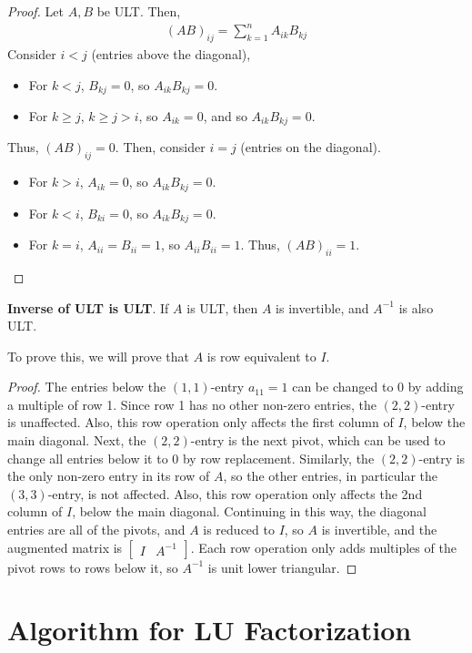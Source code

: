 \documentclass[letterpaper,12pt]{article}
\begin{document}
\begin{proof}
Let $A, B$ be ULT. Then,
\begin{align*}
    (AB)_{ij} = \sum_{k=1}^n A_{ik} B_{kj}
\end{align*}
Consider $i < j$ (entries above the diagonal),
\begin{itemize}
    \item For $k < j$, $B_{kj} = 0$, so $A_{ik} B_{kj} = 0$.
    \item For $k \geq j$, $k \geq j > i$, so $A_{ik} = 0$, and so $A_{ik} B_{kj} = 0$.
\end{itemize}
Thus, $(AB)_{ij} = 0$. Then, consider $i = j$ (entries on the diagonal).
\begin{itemize}
    \item For $k > i$, $A_{ik} = 0$, so $A_{ik} B_{kj} = 0$.
    \item For $k < i$, $B_{ki} = 0$, so $A_{ik} B_{kj} = 0$.
    \item For $k = i$, $A_{ii} = B_{ii} = 1$, so $A_{ii} B_{ii} = 1$. Thus, $(AB)_{ii} = 1$.
\end{itemize}
\end{proof}

\begin{theorem}
\textbf{Inverse of ULT is ULT}. If $A$ is ULT, then $A$ is invertible, and $A^{-1}$ is also ULT.
\end{theorem}

To prove this, we will prove that $A$ is row equivalent to $I$.

\begin{proof}
The entries below the $(1,1)$-entry $a_{11} = 1$ can be changed to 0 by adding a multiple of row 1. Since row 1 has no other non-zero entries, the $(2,2)$-entry is unaffected. Also, this row operation only affects the first column of $I$, below the main diagonal. Next, the $(2,2)$-entry is the next pivot, which can be used to change all entries below it to 0 by row replacement. Similarly, the $(2,2)$-entry is the only non-zero entry in its row of $A$, so the other entries, in particular the $(3,3)$-entry, is not affected. Also, this row operation only affects the 2nd column of $I$, below the main diagonal. Continuing in this way, the diagonal entries are all of the pivots, and $A$ is reduced to $I$, so $A$ is invertible, and the augmented matrix is $\begin{bmatrix} I & A^{-1} \end{bmatrix}$. Each row operation only adds multiples of the pivot rows to rows below it, so $A^{-1}$ is unit lower triangular.
\end{proof}

\section*{Algorithm for LU Factorization}
\end{document}
